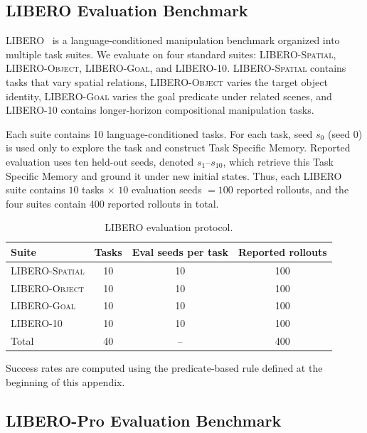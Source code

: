 \documentclass[11pt]{article}
\begin{document}
\subsection{LIBERO Evaluation Benchmark}
\label{app:benchmark:libero}

LIBERO~\citep{liu2023libero} is a language-conditioned manipulation benchmark organized into multiple task suites. We evaluate on four standard suites: \textsc{LIBERO-Spatial}, \textsc{LIBERO-Object}, \textsc{LIBERO-Goal}, and \textsc{LIBERO-10}. \textsc{LIBERO-Spatial} contains tasks that vary spatial relations, \textsc{LIBERO-Object} varies the target object identity, \textsc{LIBERO-Goal} varies the goal predicate under related scenes, and \textsc{LIBERO-10} contains longer-horizon compositional manipulation tasks.

Each suite contains 10 language-conditioned tasks. For each task, seed $s_0$ (seed 0) is used only to explore the task and construct Task Specific Memory. Reported evaluation uses ten held-out seeds, denoted $s_1$--$s_{10}$, which retrieve this Task Specific Memory and ground it under new initial states. Thus, each LIBERO suite contains $10$ tasks $\times$ $10$ evaluation seeds $=100$ reported rollouts, and the four suites contain 400 reported rollouts in total.

\begin{table}[h]
    \centering
    \caption{LIBERO evaluation protocol.}
    \label{tab:app_libero_protocol}
    \begin{tabular}{lccc}
        \toprule
        Suite & Tasks & Eval seeds per task & Reported rollouts \\
        \midrule
        \textsc{LIBERO-Spatial} & 10 & 10 & 100 \\
        \textsc{LIBERO-Object}  & 10 & 10 & 100 \\
        \textsc{LIBERO-Goal}    & 10 & 10 & 100 \\
        \textsc{LIBERO-10}      & 10 & 10 & 100 \\
        \midrule
        Total & 40 & -- & 400 \\
        \bottomrule
    \end{tabular}
\end{table}

Success rates are computed using the predicate-based rule defined at the beginning of this appendix.

\subsection{LIBERO-Pro Evaluation Benchmark}
\label{app:benchmark:liberopro}
\end{document}
